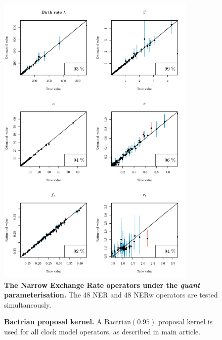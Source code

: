 \documentclass[12pt]{article}
\begin{document}
\begin{figure}[!htb]
\includegraphics[width=0.85\textwidth]{Figures/CalSim_NER_quant.pdf}
\caption{\textbf{The Narrow Exchange Rate operators under the \textit{quant} parameterisation.} The 48 NER and 48 NERw operators are tested simultaneously.}
\label{fig:rateparams}
\end{figure}




\begin{figure}[!htb]
\caption{\textbf{Bactrian proposal kernel.} A $\text{Bactrian}(0.95)$ proposal kernel is used for all clock model operators, as described in main article.}
\end{figure}






\end{document}
